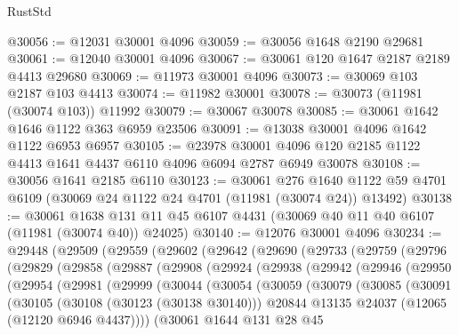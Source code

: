 \begin{lexlean}{RustStd}
\begin{coremodule}
@30056 := @12031 @30001 @4096
@30059 := @30056 @1648 @2190 @29681
@30061 := @12040 @30001 @4096
@30067 := @30061 @120 @1647 @2187 @2189 @4413 @29680
@30069 := @11973 @30001 @4096
@30073 := @30069 @103 @2187 @103 @4413
@30074 := @11982 @30001
@30078 := @30073 (@11981 (@30074 @103)) @11992
@30079 := @30067 @30078
@30085 := @30061 @1642 @1646 @1122 @363 @6959 @23506
@30091 := @13038 @30001 @4096 @1642 @1122 @6953 @6957
@30105 := @23978
    @30001
    @4096
    @120
    @2185
    @1122
    @4413
    @1641
    @4437
    @6110
    @4096
    @6094
    @2787
    @6949
    @30078
@30108 := @30056 @1641 @2185 @6110
@30123 := @30061
    @276
    @1640
    @1122
    @59
    @4701
    @6109
    (@30069 @24 @1122 @24 @4701 (@11981 (@30074 @24)) @13492)
@30138 := @30061
    @1638
    @131
    @11
    @45
    @6107
    @4431
    (@30069 @40 @11 @40 @6107 (@11981 (@30074 @40)) @24025)
@30140 := @12076 @30001 @4096
@30234 := @29448
    (@29509
      (@29559
        (@29602
          (@29642
            (@29690
              (@29733
                (@29759
                  (@29796
                    (@29829
                      (@29858
                        (@29887
                          (@29908
                            (@29924
                              (@29938
                                (@29942
                                  (@29946
                                    (@29950
                                      (@29954
                                        (@29981
                                          (@29999
                                            (@30044
                                              (@30054
                                                (@30059
                                                  (@30079
                                                    (@30085
                                                      (@30091
                                                        (@30105
                                                          (@30108 (@30123 (@30138 @30140)))
                                                          @20844
                                                          @13135
                                                          @24037
                                                          (@12065 (@12120 @6946 @4437))))
                                                      (@30061
                                                        @1644
                                                        @131
                                                        @28
                                                        @45

\end{coremodule}
\end{lexlean}
